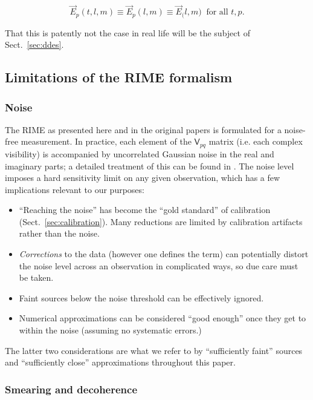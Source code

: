\documentclass[]{aa}
\newcommand{\jones}[2]{\vec {#1}_{#2}}
\newcommand{\coh}[2]{\mathsf{{#1}}_{{#2}}}
\begin{document}
\[
\jones{E}{p}(t,l,m) \equiv \jones{E}{p}(l,m) \equiv \jones{E}(l,m)\;\;\mbox{for all~} t,p. 
\]

That this is patently not the case in real life will be the subject of Sect.~\ref{sec:ddes}.

\subsection{Limitations of the RIME formalism}

\subsubsection{\label{sec:noise}Noise}

The RIME as presented here and in the original papers is formulated for a noise-free measurement. In practice, each element of the $\coh{V}{pq}$ matrix (i.e. each complex visibility) is accompanied by uncorrelated Gaussian noise in the real and imaginary parts; a detailed treatment of this can be found in \citet[Sect.~6.2]{tms}. The noise level imposes a hard sensitivity limit on any given observation, which has a few implications relevant to our purposes:

\begin{itemize}
\item ``Reaching the noise'' has become the ``gold standard'' of calibration (Sect.~\ref{sec:calibration}). 
Many reductions are limited by calibration artifacts rather than the noise.
\item {\em Corrections} to the data (however one defines the term) can potentially distort the noise level across an observation in complicated ways, so due care must be taken.
\item Faint sources below the noise threshold can be effectively ignored.
\item Numerical approximations can be considered ``good enough'' once they get to within the noise (assuming no systematic errors.)
\end{itemize}

The latter two considerations are what we refer to by ``sufficiently faint'' sources and ``sufficiently close'' approximations throughout this paper.

\subsubsection{\label{sec:smearing}Smearing and decoherence}
\end{document}
